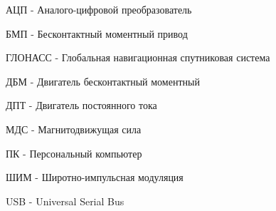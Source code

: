 \abb

\noindent
АЦП - Аналого-цифровой преобразователь

\noindent
БМП - Бесконтактный моментный привод

\noindent
ГЛОНАСС - Глобальная навигационная спутниковая система

\noindent
ДБМ - Двигатель бесконтактный моментный

\noindent
ДПТ - Двигатель постоянного тока

\noindent
МДС - Магнитодвижущая сила

\noindent
ПК - Персональный компьютер

\noindent
ШИМ - Широтно-импульсная модуляция

\noindent
USB - Universal Serial Bus